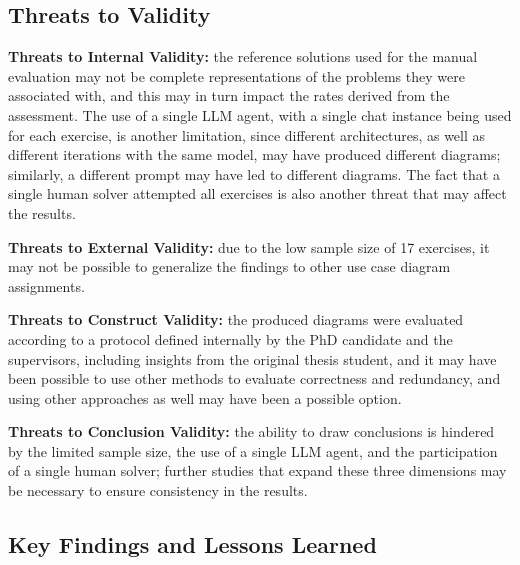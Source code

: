 
\subsection{Threats to Validity}

\textbf{Threats to Internal Validity:} the reference solutions used for the manual evaluation may not be complete representations of the problems they were associated with, and this may in turn impact the rates derived from the assessment. The use of a single LLM agent, with a single chat instance being used for each exercise, is another limitation, since different architectures, as well as different iterations with the same model, may have produced different diagrams; similarly, a different prompt may have led to different diagrams. The fact that a single human solver attempted all exercises is also another threat that may affect the results. 

\textbf{Threats to External Validity:} due to the low sample size of 17 exercises, it may not be possible to generalize the findings to other use case diagram assignments.

\textbf{Threats to Construct Validity:} the produced diagrams were evaluated according to a protocol defined internally by the PhD candidate and the supervisors, including insights from the original thesis student, and it may have been possible to use other methods to evaluate correctness and redundancy, and using other approaches as well may have been a possible option.

\textbf{Threats to Conclusion Validity:} the ability to draw conclusions is hindered by the limited sample size, the use of a single LLM agent, and the participation of a single human solver; further studies that expand these three dimensions may be necessary to ensure consistency in the results. 

\subsection{Key Findings and Lessons Learned}

